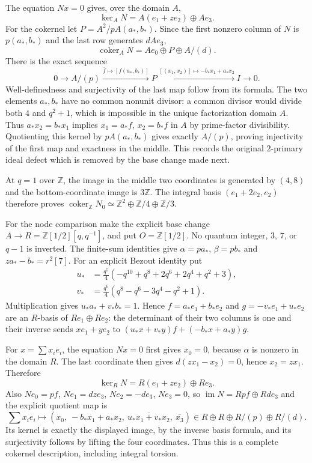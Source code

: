 The equation $Nx=0$ gives, over the domain $A$,
\[
 \ker_AN=A(e_1+ze_2)\oplus Ae_3.
\]
For the cokernel let $P=A^2/pA(a_*,b_*)$. Since the first nonzero
column of $N$ is $p(a_*,b_*)$ and the last row generates $dAe_3$,
\[
 \operatorname{coker}_AN=Ae_0\oplus P\oplus A/(d).
\]
There is the exact sequence
\[
 0\longrightarrow A/(p)\xrightarrow{\bar f\mapsto[f(a_*,b_*)]}
 P\xrightarrow{[(x_1,x_2)]\mapsto-b_*x_1+a_*x_2} I
 \longrightarrow0.
\]
Well-definedness and surjectivity of the last map follow from its
formula. The two elements $a_*,b_*$ have no common nonunit divisor:
a common divisor would divide both $4$ and $q^2+1$, which is
impossible in the unique factorization domain $A$. Thus
$a_*x_2=b_*x_1$ implies $x_1=a_*f$, $x_2=b_*f$ in $A$ by
prime-factor divisibility. Quotienting this kernel by $pA(a_*,b_*)$
gives exactly $A/(p)$, proving injectivity of the first map and
exactness in the middle. This records the original $2$-primary
ideal defect which is removed by the base change made next.

At $q=1$ over $\mathbb Z$, the image in the middle two coordinates
is generated by $(4,8)$ and the bottom-coordinate image is $3\mathbb Z$.
The integral basis $(e_1+2e_2,e_2)$ therefore proves
$\operatorname{coker}_{\mathbb Z}N_0\simeq
\mathbb Z^2\oplus\mathbb Z/4\oplus\mathbb Z/3$.

For the node comparison make the explicit base change
$A\to R=\mathbb Z[1/2][q,q^{-1}]$, and put $O=\mathbb Z[1/2]$.
No quantum integer, $3$, $7$, or $q-1$ is inverted.
The finite-sum identities give $\alpha=pa_*$, $\beta=pb_*$ and
$za_*-b_*=r^2[7]$. For an explicit Bezout identity put
\begin{align*}
 u_*&=\frac{q^5}{4}(-q^{10}+q^8+2q^6+2q^4+q^2+3),\\
 v_*&=\frac{q^6}{4}(q^8-q^6-3q^4-q^2+1).
\end{align*}
Multiplication gives $u_*a_*+v_*b_*=1$. Hence
$f=a_*e_1+b_*e_2$ and $g=-v_*e_1+u_*e_2$ are an $R$-basis of
$Re_1\oplus Re_2$: the determinant of their two columns is one
and their inverse sends $xe_1+ye_2$ to
$(u_*x+v_*y)f+(-b_*x+a_*y)g$.

For $x=\sum x_ie_i$, the equation $Nx=0$ first gives $x_0=0$,
because $\alpha$ is nonzero in the domain $R$. The last coordinate
then gives $d(zx_1-x_2)=0$, hence $x_2=zx_1$. Therefore
\[
 \ker_RN=R(e_1+ze_2)\oplus Re_3.
\]
Also $Ne_0=pf$, $Ne_1=dz e_3$, $Ne_2=-d e_3$, $Ne_3=0$,
so $\operatorname{im}N=Rpf\oplus Rd e_3$ and the explicit quotient
map is
\[
 \sum x_ie_i\longmapsto
 (x_0,\ -b_*x_1+a_*x_2,\ 
  \overline{u_*x_1+v_*x_2},\ \overline{x_3})
 \in R\oplus R\oplus R/(p)\oplus R/(d).
\]
Its kernel is exactly the displayed image, by the inverse basis
formula, and its surjectivity follows by lifting the four coordinates.
Thus this is a complete cokernel description, including integral torsion.

